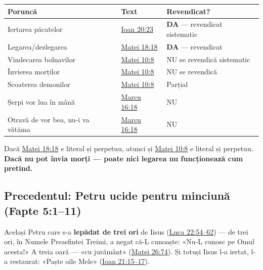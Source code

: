 \documentclass[12pt,a4paper,twoside,openany]{book}
\begin{document}
\begin{center}
\small
\begin{tabular}{L{7.0cm}L{2.3cm}L{5.5cm}}
\toprule
{}
\textbf{Poruncă} & \textbf{Text} & \textbf{Revendicat?} \\
\midrule
Iertarea păcatelor & \href{https://bibliaortodoxa.ro/carte.php?id=35\&cap=20\#23}{Ioan 20:23} & \textbf{DA} — revendicat sistematic \\
Legarea/dezlegarea & \href{https://bibliaortodoxa.ro/carte.php?id=55\&cap=18\#18}{Matei 18:18} & \textbf{DA} — revendicat \\
Vindecarea bolnavilor & \href{https://bibliaortodoxa.ro/carte.php?id=55\&cap=10\#8}{Matei 10:8} & NU se revendică sistematic \\
Învierea morților & \href{https://bibliaortodoxa.ro/carte.php?id=55\&cap=10\#8}{Matei 10:8} & NU se revendică \\
Scoaterea demonilor & \href{https://bibliaortodoxa.ro/carte.php?id=55\&cap=10\#8}{Matei 10:8} & Parțial \\
Șerpi vor lua în mână & \href{https://bibliaortodoxa.ro/carte.php?id=53\&cap=16\#18}{Marcu 16:18} & NU \\
Otravă de vor bea, nu-i va vătăma & \href{https://bibliaortodoxa.ro/carte.php?id=53\&cap=16\#18}{Marcu 16:18} & NU \\
\bottomrule
\end{tabular}
\end{center}
\normalsize
Dacă \href{https://bibliaortodoxa.ro/carte.php?id=55\&cap=18\#18}{Matei 18:18} e literal și perpetuu, atunci și \href{https://bibliaortodoxa.ro/carte.php?id=55\&cap=10\#8}{Matei 10:8} e literal și perpetuu. \\

\textbf{Dacă nu pot învia morți — poate nici legarea nu funcționează cum pretind.}


\subsection{Precedentul: Petru ucide pentru minciună (Fapte 5:1–11)}
Același Petru care s-a \textbf{lepădat de trei ori} de Iisus (\href{https://bibliaortodoxa.ro/carte.php?id=48\&cap=22\#54}{Luca 22:54–62}) — de trei ori, în Numele Preasfintei Treimi, a negat că-L cunoaște: «Nu-L cunosc pe Omul acesta!» A treia oară — «cu jurământ» (\href{https://bibliaortodoxa.ro/carte.php?id=55\&cap=26\#74}{Matei 26:74}). Și totuși Iisus l-a iertat, l-a restaurat: «Paște oile Mele» (\href{https://bibliaortodoxa.ro/carte.php?id=35\&cap=21\#15}{Ioan 21:15–17}).
\end{document}
